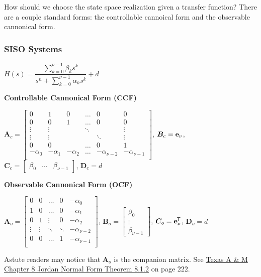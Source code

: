 \documentclass[11pt]{article}
\begin{document}
  How should we choose the state space realization given a transfer function? There are a couple standard forms:
  the controllable cannoical form and the observable cannonical form.

  \subsubsection{SISO Systems}

  \(H(s) =  \dfrac{\displaystyle \sum_{k = 0}^{\nu - 1} \beta_ks^k}{s^n + \displaystyle \sum_{k = 0}^{\nu - 1} \alpha_ks^k} + d\)

  \textbf{Controllable Cannonical Form (CCF)}

  \(\bm{A}_c =
  \begin{bmatrix}
    0 & 1 & 0 & \dots & 0 & 0 \\
    0 & 0 & 1 & \dots & 0 & 0 \\
    \vdots & \vdots & & \ddots & & \vdots \\
    \vdots & \vdots & & & \ddots & \vdots \\
    0 & 0 & & \dots & 0 & 1 \\
    -\alpha_0 & -\alpha_1 & -\alpha_2 & \dots & -\alpha_{\nu - 2} & -\alpha_{\nu - 1} \\
  \end{bmatrix}\),
  \(\bm{B}_c = \mathbf{e}_{\nu}\),
  \(\bm{C}_c = \begin{bmatrix} \beta_0 & \dots & \beta_{\nu - 1}\end{bmatrix}\),
  \(\bm{D}_c = d\)

  \textbf{Observable Cannonical Form (OCF)}

  \(\bm{A}_o =
  \begin{bmatrix}
    0 & 0 & \dots & 0 & -\alpha_0 \\
    1 & 0 & \dots & 0 & -\alpha_1 \\
    0 & 1 & \vdots & 0 & -\alpha_2 \\
    \vdots & \vdots & \ddots & \ddots & -\alpha_{\nu - 2} \\
    0 & 0 & \dots & 1 & -\alpha_{\nu - 1} \\
  \end{bmatrix}\),
  \(\bm{B}_o = \begin{bmatrix} \beta_0 \\ \vdots \\ \beta_{\nu - 1}\end{bmatrix}\),
  \(\bm{C}_o = \mathbf{e}_{\nu}^{\mkern-1.5mu\mathsf{T}}\),
  \(\bm{D}_o = d\)

  Astute readers may notice that \(\bm{A}_o\) is the companion matrix. See
  \href{https://www.math.tamu.edu/~dallen/m640_03c/lectures/chapter8.pdf}{Texas A \& M Chapter 8 Jordan Normal Form Theorem 8.1.2}
  on page 222.
\end{document}
